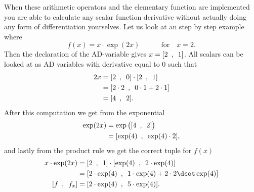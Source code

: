 When these arithmetic operators and the elementary function are implemented you are able to calculate any scalar function derivative without actually doing any form of differentiation yourselves. Let us look at an step by step example where 
\begin{equation}
    \label{eq:forwardADExample}
    f(x) = x\cdot\exp(2x) \hspace{3em} \text{for}\hspace{1em} x = 2.
\end{equation}
Then the declaration of the AD-variable gives $x = [2 \hspace{0.5em} , \hspace{0.5em}  1]$. All scalars can be looked at as AD variables with derivative equal to 0 such that
\begin{align*}
    2x &= [2 \hspace{0.5em} , \hspace{0.5em}  0]\cdot [2 \hspace{0.5em} , \hspace{0.5em} 1] \\
    &=[2\cdot2 \hspace{0.5em} , \hspace{0.5em}  0\cdot1 + 2\cdot 1]\\
    &=[4 \hspace{0.5em} , \hspace{0.5em} 2].
\end{align*}
After this computation we get from the exponential
\begin{align*}
    \exp(2x) &= \exp\big([4 \hspace{0.5em} , \hspace{0.5em} 2]\big)\\
    &= [\exp(4) \hspace{0.5em} , \hspace{0.5em} \exp(4)\cdot 2],
\end{align*}
and lastly from the product rule we get the correct tuple for $f(x)$
\begin{align*}
    x\cdot \exp(2x) &= [2 \hspace{0.5em} , \hspace{0.5em}  1]\cdot [\exp(4)\hspace{0.5em}, \hspace{0.5em} 2\cdot\exp(4)]\\
    &=[2\cdot\exp(4) \hspace{0.5em} , \hspace{0.5em}  1\cdot \exp(4) + 2\cdot 2\dcot\exp(4)]\\
    [f\hspace{0.5em},\hspace{0.5em} f_x] &=[2\cdot\exp(4) \hspace{0.5em} , \hspace{0.5em} 5\cdot\exp(4)].
\end{align*}
